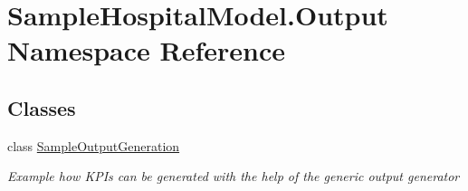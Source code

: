 \hypertarget{namespace_sample_hospital_model_1_1_output}{}\section{Sample\+Hospital\+Model.\+Output Namespace Reference}
\label{namespace_sample_hospital_model_1_1_output}
\subsection*{Classes}
\begin{DoxyCompactItemize}
\item 
class \hyperlink{class_sample_hospital_model_1_1_output_1_1_sample_output_generation}{Sample\+Output\+Generation}
\begin{DoxyCompactList}\small\item\em Example how K\+P\+Is can be generated with the help of the generic output generator \end{DoxyCompactList}\end{DoxyCompactItemize}
